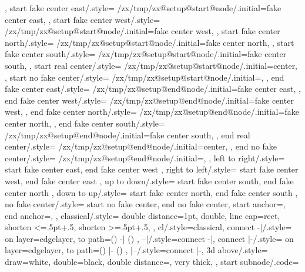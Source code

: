 {{{{      }%
    },
    start fake center east/.style={%
      /zx/tmp/zx@setup@start@node/.initial=fake center east,
    },
    start fake center west/.style={%
      /zx/tmp/zx@setup@start@node/.initial=fake center west,
    },
    start fake center north/.style={%
      /zx/tmp/zx@setup@start@node/.initial=fake center north,
    },
    start fake center south/.style={%
      /zx/tmp/zx@setup@start@node/.initial=fake center south,
    },
    start real center/.style={
      /zx/tmp/zx@setup@start@node/.initial=center,
    },
    start no fake center/.style={
      /zx/tmp/zx@setup@start@node/.initial=,
    },
    end fake center east/.style={%
      /zx/tmp/zx@setup@end@node/.initial=fake center east,
    },
    end fake center west/.style={%
      /zx/tmp/zx@setup@end@node/.initial=fake center west,
    },
    end fake center north/.style={%
      /zx/tmp/zx@setup@end@node/.initial=fake center north,
    },
    end fake center south/.style={%
      /zx/tmp/zx@setup@end@node/.initial=fake center south,
    },
    end real center/.style={
      /zx/tmp/zx@setup@end@node/.initial=center,
    },
    end no fake center/.style={
      /zx/tmp/zx@setup@end@node/.initial=,
    },
    left to right/.style={
      start fake center east,
      end fake center west
    },
    right to left/.style={
      start fake center west,
      end fake center east
    },
    up to down/.style={
      start fake center south,
      end fake center north
    },
    down to up/.style={
      start fake center north,
      end fake center south
    },
    no fake center/.style={
      start no fake center,
      end no fake center,
      start anchor=,
      end anchor=,
    },
    classical/.style={
      double distance=1pt,
      double,
      line cap=rect,
      shorten <=.5pt+.5\pgflinewidth,
      shorten >=.5pt+.5\pgflinewidth,
    },
    cl/.style={classical},
    connect -|/.style={
      on layer={edgelayer},
      to path={(\tikztostart) -| (\tikztotarget) \tikztonodes}
    },
    --|/.style={connect -|},
    connect |-/.style={
      on layer={edgelayer},
      to path={(\tikztostart) |- (\tikztotarget) \tikztonodes}
    },
    |--/.style={connect |-},
    3d above/.style={
      draw=white,
      double=black,
      double distance=\pgflinewidth,
      very thick,
    },
    start subnode/.code={%
}}}
